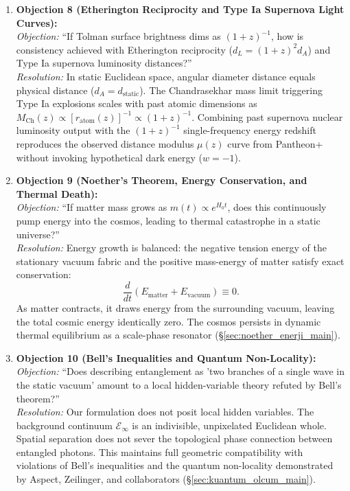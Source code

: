 \begin{enumerate}
    \item \textbf{Objection 8 (Etherington Reciprocity and Type Ia Supernova Light Curves):} \\
          \textit{Objection:} ``If Tolman surface brightness dims as $(1+z)^{-1}$, how is consistency achieved with Etherington reciprocity ($d_L = (1+z)^2 d_A$) and Type Ia supernova luminosity distances?'' \\
          \textit{Resolution:} In static Euclidean space, angular diameter distance equals physical distance ($d_A = d_{\mathrm{static}}$). The Chandrasekhar mass limit triggering Type Ia explosions scales with past atomic dimensions as $M_{\mathrm{Ch}}(z) \propto [r_{\mathrm{atom}}(z)]^{-1} \propto (1+z)^{-1}$. Combining past supernova nuclear luminosity output with the $(1+z)^{-1}$ single-frequency energy redshift reproduces the observed distance modulus $\mu(z)$ curve from Pantheon+ without invoking hypothetical dark energy ($w=-1$).

    \item \textbf{Objection 9 (Noether's Theorem, Energy Conservation, and Thermal Death):} \\
          \textit{Objection:} ``If matter mass grows as $m(t) \propto e^{H_0 t}$, does this continuously pump energy into the cosmos, leading to thermal catastrophe in a static universe?'' \\
          \textit{Resolution:} Energy growth is balanced: the negative tension energy of the stationary vacuum fabric and the positive mass-energy of matter satisfy exact conservation:
          \begin{equation}
              \frac{d}{dt} \left( E_{\mathrm{matter}} + E_{\mathrm{vacuum}} \right) \equiv 0.
          \end{equation}
          As matter contracts, it draws energy from the surrounding vacuum, leaving the total cosmic energy identically zero. The cosmos persists in dynamic thermal equilibrium as a scale-phase resonator (\S\ref{sec:noether_enerji_main}).

    \item \textbf{Objection 10 (Bell's Inequalities and Quantum Non-Locality):} \\
          \textit{Objection:} ``Does describing entanglement as 'two branches of a single wave in the static vacuum' amount to a local hidden-variable theory refuted by Bell's theorem?'' \\
          \textit{Resolution:} Our formulation does not posit local hidden variables. The background continuum $\mathcal{E}_\infty$ is an indivisible, unpixelated Euclidean whole. Spatial separation does not sever the topological phase connection between entangled photons. This maintains full geometric compatibility with violations of Bell's inequalities and the quantum non-locality demonstrated by Aspect, Zeilinger, and collaborators (\S\ref{sec:kuantum_olcum_main}).
\end{enumerate}

